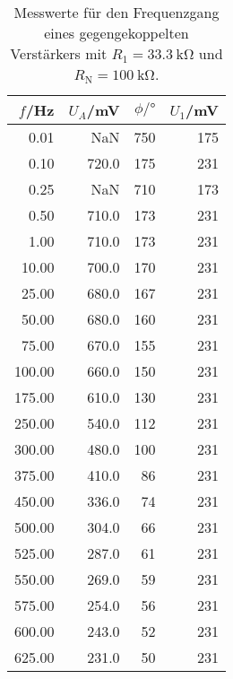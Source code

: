 \begin{table}
  \centering
\begin{tabular}{rrrr}
     $f$/Hz &  $U_A$/mV &  $\phi/\si{\degree}$ &  $U_1$/mV \\
\midrule
   0.01 &    NaN &  750 &  175 \\
   0.10 &  720.0 &  175 &  231 \\
   0.25 &    NaN &  710 &  173 \\
   0.50 &  710.0 &  173 &  231 \\
   1.00 &  710.0 &  173 &  231 \\
  10.00 &  700.0 &  170 &  231 \\
  25.00 &  680.0 &  167 &  231 \\
  50.00 &  680.0 &  160 &  231 \\
  75.00 &  670.0 &  155 &  231 \\
 100.00 &  660.0 &  150 &  231 \\
 175.00 &  610.0 &  130 &  231 \\
 250.00 &  540.0 &  112 &  231 \\
 300.00 &  480.0 &  100 &  231 \\
 375.00 &  410.0 &   86 &  231 \\
 450.00 &  336.0 &   74 &  231 \\
 500.00 &  304.0 &   66 &  231 \\
 525.00 &  287.0 &   61 &  231 \\
 550.00 &  269.0 &   59 &  231 \\
 575.00 &  254.0 &   56 &  231 \\
 600.00 &  243.0 &   52 &  231 \\
 625.00 &  231.0 &   50 &  231 \\
\end{tabular}
\caption{Messwerte für den Frequenzgang eines gegengekoppelten Verstärkers mit $R_1 = \SI{33.3}{\kilo\ohm}$ und $R_\text{N} = \SI{100}{\kilo\ohm}$.}
\end{table}
